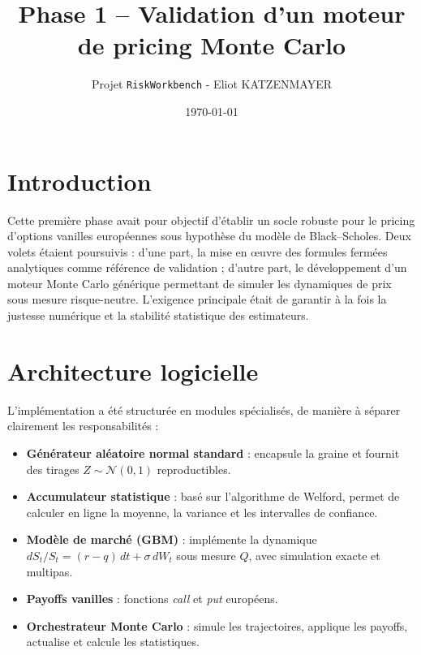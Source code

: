 \documentclass[a4paper,11pt]{article}
\title{Phase 1 -- Validation d'un moteur de pricing Monte Carlo}
\author{Projet \texttt{RiskWorkbench} - Eliot KATZENMAYER}
\date{\today}
\begin{document}
\maketitle

\section{Introduction}
Cette première phase avait pour objectif d’établir un socle robuste pour le pricing d’options vanilles européennes sous hypothèse du modèle de Black--Scholes. Deux volets étaient poursuivis : d’une part, la mise en œuvre des formules fermées analytiques comme référence de validation ; d’autre part, le développement d’un moteur Monte Carlo générique permettant de simuler les dynamiques de prix sous mesure risque-neutre. L’exigence principale était de garantir à la fois la justesse numérique et la stabilité statistique des estimateurs.

\section{Architecture logicielle}
L’implémentation a été structurée en modules spécialisés, de manière à séparer clairement les responsabilités :
\begin{itemize}
  \item \textbf{Générateur aléatoire normal standard} : encapsule la graine et fournit des tirages $Z \sim \mathcal{N}(0,1)$ reproductibles.
  \item \textbf{Accumulateur statistique} : basé sur l’algorithme de Welford, permet de calculer en ligne la moyenne, la variance et les intervalles de confiance.
  \item \textbf{Modèle de marché (GBM)} : implémente la dynamique $dS_t/S_t = (r-q)\,dt + \sigma\,dW_t$ sous mesure $Q$, avec simulation exacte et multipas.
  \item \textbf{Payoffs vanilles} : fonctions \emph{call} et \emph{put} européens.
  \item \textbf{Orchestrateur Monte Carlo} : simule les trajectoires, applique les payoffs, actualise et calcule les statistiques.
\end{itemize}
\end{document}
